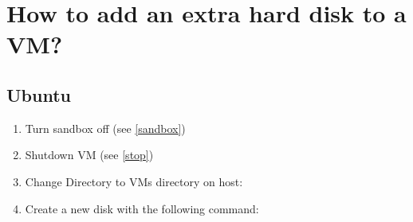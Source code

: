 \section{How to add an extra hard disk to a VM?}
\subsection*{Ubuntu}
\begin{enumerate}
\item Turn sandbox off (see \ref{sandbox})
\item Shutdown VM (see \ref{stop})
\item Change Directory to VMs directory on host:\\
\item Create a new disk with the following command:\\


\end{enumerate}
